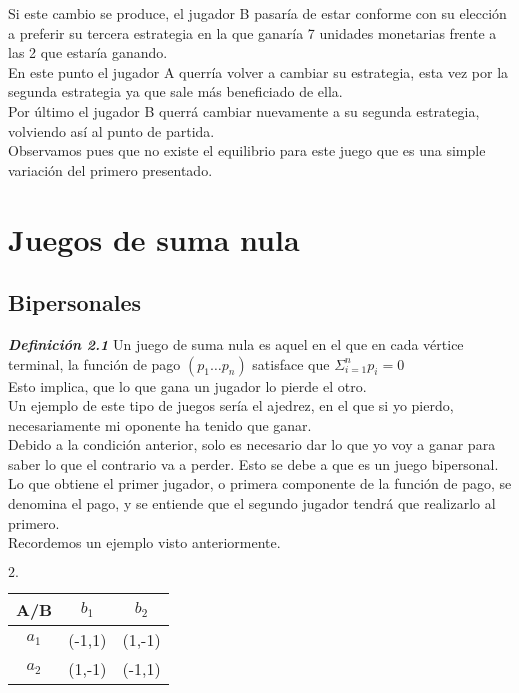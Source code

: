 \documentclass[10pt,a4paper]{book}
\begin{document}
Si este cambio se produce, el jugador B pasaría de estar conforme con su elección a preferir su tercera estrategia en la que ganaría 7 unidades monetarias frente a las 2 que estaría ganando.\\

En este punto el jugador A querría volver a cambiar su estrategia, esta vez por la segunda estrategia ya que sale más beneficiado de ella. \\

Por último el jugador B querrá cambiar nuevamente a su segunda estrategia, volviendo así al punto de partida.\\

Observamos pues que no existe el equilibrio para este juego que es una simple variación del primero presentado.\\

\newpage

\chapter{Juegos de suma nula}	

\section{Bipersonales}

\textit{\textbf{Definición 2.1}} Un juego de suma nula es aquel en el que en cada vértice terminal, la función de pago $(p_1 \ldots p_n)$ satisface que $\Sigma_{i=1}^{n} p_i= 0 $\\
Esto implica, que lo que gana un jugador lo pierde el otro.\\ 
Un ejemplo de este tipo de juegos sería el ajedrez, en el que si yo pierdo, necesariamente mi oponente ha tenido que ganar.\\
Debido a la condición anterior, solo es necesario dar lo que yo voy a ganar para saber lo que el contrario va a perder. Esto se debe a que es un juego bipersonal.\\

Lo que obtiene el primer jugador, o primera componente de la función de pago, se denomina el pago, y se entiende que el segundo jugador tendrá que realizarlo al primero.\\


Recordemos un ejemplo visto anteriormente.\\

\begin{center}
		$2. \quad$
	\begin{tabular}{|c|c|c|}
		\hline
		A/B & $b_1$ & $b_2$ \\
		\hline
		$a_1$ & (-1,1) & (1,-1) \\
		\hline
		$a_2$ & (1,-1) & (-1,1) \\
		\hline
	\end{tabular}
\end{center}
\end{document}
